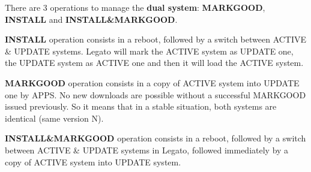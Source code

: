 There are 3 operations to manage the {\bfseries dual system}\+: {\bfseries M\+A\+R\+K\+G\+O\+OD}, {\bfseries I\+N\+S\+T\+A\+LL} and {\bfseries I\+N\+S\+T\+A\+LL\&M\+A\+R\+K\+G\+O\+OD}.


\begin{DoxyItemize}
\item {\bfseries I\+N\+S\+T\+A\+LL} operation consists in a reboot, followed by a switch between A\+C\+T\+I\+VE \& U\+P\+D\+A\+TE systems. Legato will mark the A\+C\+T\+I\+VE system as U\+P\+D\+A\+TE one, the U\+P\+D\+A\+TE system as A\+C\+T\+I\+VE one and then it will load the A\+C\+T\+I\+VE system.
\end{DoxyItemize}

\begin{center}  \end{center} 


\begin{DoxyItemize}
\item {\bfseries M\+A\+R\+K\+G\+O\+OD} operation consists in a copy of A\+C\+T\+I\+VE system into U\+P\+D\+A\+TE one by A\+P\+PS. No new downloads are possible without a successful M\+A\+R\+K\+G\+O\+OD issued previously. So it means that in a stable situation, both systems are identical (same version N).
\end{DoxyItemize}

\begin{center}  \end{center} 


\begin{DoxyItemize}
\item {\bfseries I\+N\+S\+T\+A\+LL\&M\+A\+R\+K\+G\+O\+OD} operation consists in a reboot, followed by a switch between A\+C\+T\+I\+VE \& U\+P\+D\+A\+TE systems in Legato, followed immediately by a copy of A\+C\+T\+I\+VE system into U\+P\+D\+A\+TE system.
\end{DoxyItemize}


